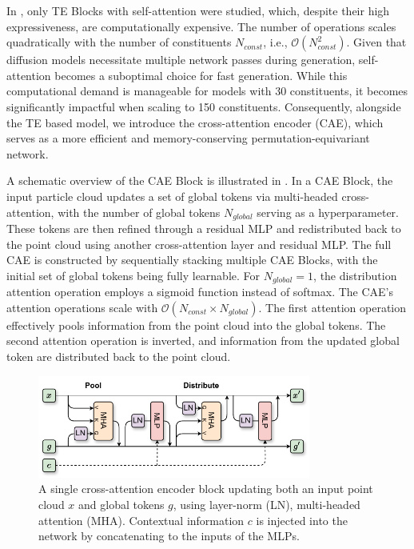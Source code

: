 In \pcjedi, only TE Blocks with self-attention were studied, which, despite their high expressiveness, are computationally expensive.
The number of operations scales quadratically with the number of constituents $N_{const}$, i.e., $\mathcal{O}(N_{const}^2)$.
Given that diffusion models necessitate multiple network passes during generation, self-attention becomes a suboptimal choice for fast generation.
While this computational demand is manageable for models with 30 constituents, it becomes significantly impactful when scaling to 150 constituents.
Consequently, alongside the TE based model, we introduce the cross-attention encoder (CAE), which serves as a more efficient and memory-conserving permutation-equivariant network.

A schematic overview of the CAE Block is illustrated in .
In a CAE Block, the input particle cloud updates a set of global tokens via multi-headed cross-attention, with the number of global tokens $N_{global}$ serving as a hyperparameter.
These tokens are then refined through a residual MLP and redistributed back to the point cloud using another cross-attention layer and residual MLP.
The full CAE is constructed by sequentially stacking multiple CAE Blocks, with the initial set of global tokens being fully learnable.
For $N_{global}=1$, the distribution attention operation employs a sigmoid function instead of softmax.
The CAE's attention operations scale with $\mathcal{O}(N_{const} \times N_{global})$.
The first attention operation effectively pools information from the point cloud into the global tokens. The second attention operation is inverted, and information from the updated global token are distributed back to the point cloud.

\begin{figure}[htpb]
    \centering
    \includegraphics[width=0.8\textwidth]{Figures/jet_generation/CAEB.pdf}
    \caption{A single cross-attention encoder block updating both an input point cloud $x$ and global tokens $g$, using layer-norm (LN), multi-headed attention (MHA). Contextual information $c$ is injected into the network by concatenating to the inputs of the MLPs.}
    \label{fig:cae_network}
\end{figure}

